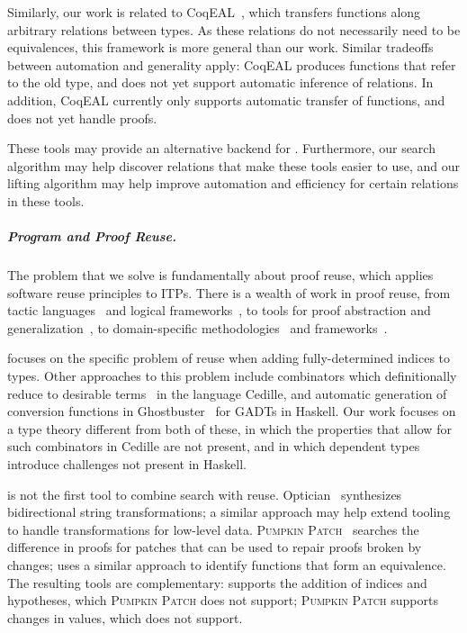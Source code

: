 Similarly, our work is related to CoqEAL~\cite{cohen:hal-01414881}, which transfers functions along arbitrary relations
between types. As these relations do not necessarily need to be equivalences, this framework is more general
than our work. Similar tradeoffs between automation and generality apply: CoqEAL produces functions that refer to the old type,
and does not yet support automatic inference of relations. In addition, CoqEAL currently only supports automatic transfer of functions,
and does not yet handle proofs.

These tools may provide an alternative backend for \toolnameb. Furthermore,
our search algorithm may help discover relations that make these tools easier to use,
and our lifting algorithm may help improve automation and efficiency for 
certain relations in these tools.

\subparagraph*{Program and Proof Reuse.}
The problem that we solve is fundamentally about proof reuse,
which applies software reuse principles to ITPs. 
There is a wealth of work in proof reuse, from tactic languages~\cite{felty1994generalization} and logical frameworks~\cite{caplan1995logical},
to tools for proof abstraction and generalization~\cite{pons00, johnsen2004theorem},
to domain-specific methodologies~\cite{Delaware:2011:PLT:2048066.2048113} and frameworks~\cite{Delaware:2013:MLC:2429069.2429094}.

\toolnameb focuses on the specific problem of reuse
when adding fully-determined indices to types.
Other approaches to this problem include combinators which definitionally reduce to desirable terms~\cite{DBLP:journals/corr/abs-1803-08150} in the language Cedille,
and automatic generation of conversion functions in Ghostbuster~\cite{McDonell:2016:GTS:2951913.2951914} for GADTs in Haskell.
Our work focuses on a type theory different from both of these, in which the properties that allow for such combinators in Cedille are not present, and in which dependent types introduce challenges not present in Haskell.

\toolnameb is not the first tool to combine search with reuse. 
Optician~\cite{miltner2017synthesizing} synthesizes bidirectional string transformations;
a similar approach may help extend tooling to handle transformations for low-level data.
\textsc{Pumpkin Patch}~\cite{ringer2018adapting} 
searches the difference in proofs for patches that can be used to repair proofs broken by changes;
\toolnameb uses a similar approach to identify functions
that form an equivalence. The resulting tools are complementary: \toolnameb supports the addition
of indices and hypotheses, which \textsc{Pumpkin Patch} does not support; \textsc{Pumpkin Patch} supports changes
in values, which \toolnameb does not support. 

